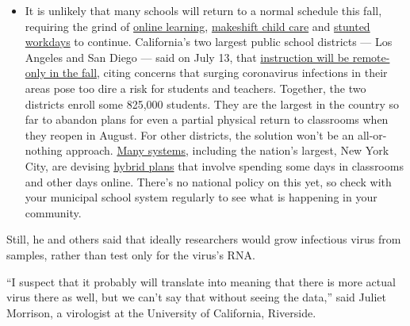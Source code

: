 \begin{itemize}
  \begin{itemize}
  \tightlist
  \item
    It is unlikely that many schools will return to a normal schedule
    this fall, requiring the grind of
    \href{https://www.nytimes.com/2020/06/05/us/coronavirus-education-lost-learning.html?action=click\&pgtype=Article\&state=default\&region=MAIN_CONTENT_3\&context=storylines_faq}{online
    learning},
    \href{https://www.nytimes.com/2020/05/29/us/coronavirus-child-care-centers.html?action=click\&pgtype=Article\&state=default\&region=MAIN_CONTENT_3\&context=storylines_faq}{makeshift
    child care} and
    \href{https://www.nytimes.com/2020/06/03/business/economy/coronavirus-working-women.html?action=click\&pgtype=Article\&state=default\&region=MAIN_CONTENT_3\&context=storylines_faq}{stunted
    workdays} to continue. California's two largest public school
    districts --- Los Angeles and San Diego --- said on July 13, that
    \href{https://www.nytimes.com/2020/07/13/us/lausd-san-diego-school-reopening.html?action=click\&pgtype=Article\&state=default\&region=MAIN_CONTENT_3\&context=storylines_faq}{instruction
    will be remote-only in the fall}, citing concerns that surging
    coronavirus infections in their areas pose too dire a risk for
    students and teachers. Together, the two districts enroll some
    825,000 students. They are the largest in the country so far to
    abandon plans for even a partial physical return to classrooms when
    they reopen in August. For other districts, the solution won't be an
    all-or-nothing approach.
    \href{https://bioethics.jhu.edu/research-and-outreach/projects/eschool-initiative/school-policy-tracker/}{Many
    systems}, including the nation's largest, New York City, are
    devising
    \href{https://www.nytimes.com/2020/06/26/us/coronavirus-schools-reopen-fall.html?action=click\&pgtype=Article\&state=default\&region=MAIN_CONTENT_3\&context=storylines_faq}{hybrid
    plans} that involve spending some days in classrooms and other days
    online. There's no national policy on this yet, so check with your
    municipal school system regularly to see what is happening in your
    community.
  \end{itemize}
\end{itemize}

Still, he and others said that ideally researchers would grow infectious
virus from samples, rather than test only for the virus's RNA.

``I suspect that it probably will translate into meaning that there is
more actual virus there as well, but we can't say that without seeing
the data,'' said Juliet Morrison, a virologist at the University of
California, Riverside.

